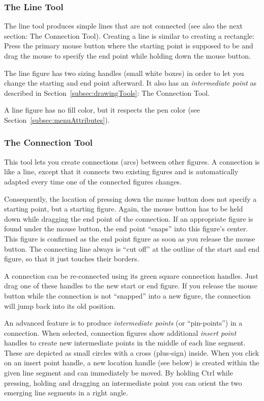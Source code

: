 
\subsubsection{The Line Tool}

The line tool produces simple lines that are not connected (see also
the next section: The Connection Tool).
Creating a line is similar to creating a rectangle:
Press the primary mouse button where the starting point is
supposed to be and drag the mouse to specify the end point while
holding down the mouse button.

The line figure has two sizing handles (small white boxes) in order
to let you change the starting and end point afterward. It also has
an {\em intermediate point\/} as described in Section~\ref{subsec:drawingTools}: 
The Connection Tool. 

A line figure has no fill color, but it respects the pen color
(see Section~\ref{subsec:menuAttributes}).


\subsubsection{The Connection Tool}
\label{subsubsec:toolConnection}

This tool lets you create connections (arcs) between other figures.
A connection is like a line, except that it connects two existing figures
and is automatically adapted every time one of the connected figures changes.

Consequently, the location of pressing down the mouse button does not
specify a starting point, but a starting figure. Again, the mouse button
has to be held down while dragging the end point of the connection.
If an appropriate figure is found under the mouse button, the end point
``snaps'' into this figure's center. This figure is confirmed as the
end point figure as soon as you release the mouse button.
The connecting line always is ``cut off'' at the outline of the start
and end figure, so that it just touches their borders.

A connection can be re-connected using its green square connection handles.
Just drag one of these handles to the new start or end figure.
If you release the mouse button while the connection is not ``snapped''
into a new figure, the connection will jump back into its old position.

An advanced feature is to produce {\em intermediate points\/} (or
``pin-points'') in a connection.
When selected, connection figures show
additional {\em insert point\/} handles to create new intermediate
points in the middle of each line segment.
These are depicted as small circles with a cross (plus-sign) inside.
When you click on an insert point handle, a new location handle (see
below) is created within the given line segment and can immediately be
moved. By holding Ctrl while pressing, holding and dragging an intermediate 
point you can orient the two emerging line segments in a right angle. 

